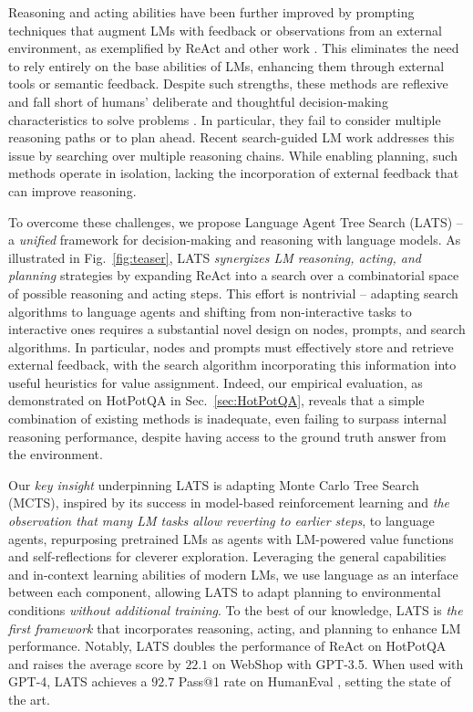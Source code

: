 \documentclass{article}
\theoremstyle{plain}
\theoremstyle{definition}
\theoremstyle{remark}
\begin{document}
Reasoning and acting abilities have been further improved by prompting techniques that augment LMs with feedback or observations from an external environment, as exemplified by ReAct \citep{yao2023react} and other work \citep{gao2022pal, shinn2023reflexion}. This eliminates the need to rely entirely on the base abilities of LMs, enhancing them through external tools or semantic feedback. Despite such strengths, these methods are reflexive and fall short of humans' deliberate and thoughtful decision-making characteristics to solve problems \citep{Sloman1996TheEC,evans2010intuition}. In particular, they fail to consider multiple reasoning paths or to plan ahead. Recent search-guided LM work \citep{xie2023decomposition, yao2023tree, hao2023reasoning} addresses this issue by searching over multiple reasoning chains. While enabling planning, such methods operate in isolation, lacking the incorporation of external feedback that can improve reasoning. 
\vspace{0.04in}

To overcome these challenges, we propose Language Agent Tree Search (LATS) -- a \emph{unified} framework for decision-making and reasoning with language models. As illustrated in Fig.~\ref{fig:teaser}, LATS \emph{synergizes LM reasoning, acting, and planning} strategies by expanding ReAct \citep{yao2023react} into a search over a combinatorial space of possible reasoning and acting steps. This effort is nontrivial -- adapting search algorithms to language agents and shifting from non-interactive tasks to interactive ones requires a substantial novel design on nodes, prompts, and search algorithms. In particular, nodes and prompts must effectively store and retrieve external feedback, with the search algorithm incorporating this information into useful heuristics for value assignment. Indeed, our empirical evaluation, as demonstrated on HotPotQA \citep{yang2018hotpotqa} in Sec.~\ref{sec:HotPotQA}, reveals that a simple combination of existing methods is inadequate, even failing to surpass internal reasoning performance, despite having access to the ground truth answer from the environment.
\vspace{0.04in}

Our \emph{key insight} underpinning LATS is adapting Monte Carlo Tree Search (MCTS), inspired by its success in model-based reinforcement learning \citep{silver2017mastering} and \textit{the observation that many LM tasks allow reverting to earlier steps}, to language agents, repurposing pretrained LMs as agents with LM-powered value functions and self-reflections for cleverer exploration. Leveraging the general capabilities and in-context learning abilities of modern LMs, we use language as an interface between each component, allowing LATS to adapt planning to environmental conditions \emph{without additional training}. To the best of our knowledge, LATS is \emph{the first framework} that incorporates reasoning, acting, and planning to enhance LM performance. Notably, LATS doubles the performance of ReAct \citep{yao2023react} on HotPotQA \citep{yang2018hotpotqa} and raises the average score by $22.1$ on WebShop \citep{yao2022webshop} with GPT-3.5. When used with GPT-4, LATS achieves a $92.7$ Pass@1 rate on HumanEval \citep{chen2021evaluating}, setting the state of the art. 
\end{document}
